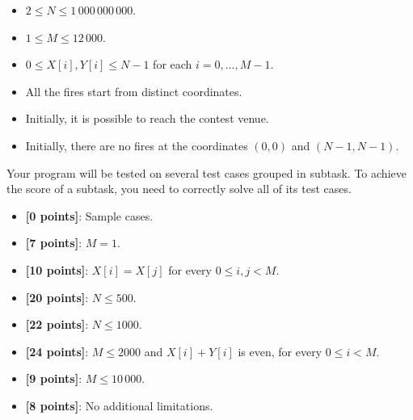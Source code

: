 \Constraints

\begin{itemize}[nolistsep, itemsep=2mm]
	\item $2 \le N \le 1\,000\,000\,000$.
	\item $1 \le M \le 12\,000$.
	\item $0 \le X[i], Y[i] \le N-1$ for each $i = 0, \ldots, M-1$.
	\item All the fires start from distinct coordinates.
	\item Initially, it is possible to reach the contest venue.
	\item Initially, there are no fires at the coordinates $(0,0)$ and $(N-1, N-1)$.
\end{itemize}


\Scoring

Your program will be tested on several test cases grouped in subtask. To
achieve the score of a subtask, you need to correctly solve all of its test cases.


\begin{itemize}[nolistsep,itemsep=2mm]
  \item \textbf{ [\phantom{1}0 points]}: Sample cases.
  \item \textbf{ [\phantom{1}7 points]}: $M=1$.
  \item \textbf{ [10 points]}: $X[i] = X[j]$ for every $0 \leq i, j < M$.
  \item \textbf{ [20 points]}: $N \leq 500$.
  \item \textbf{ [22 points]}: $N \leq 1000$.
  \item \textbf{ [24 points]}: $M \leq 2000$ and $X[i] + Y[i]$ is even, for every $0 \leq i < M$.
  \item \textbf{ [\phantom{1}9 points]}: $M \leq 10\,000$.
  \item \textbf{ [\phantom{1}8 points]}: No additional limitations.
\end{itemize}


